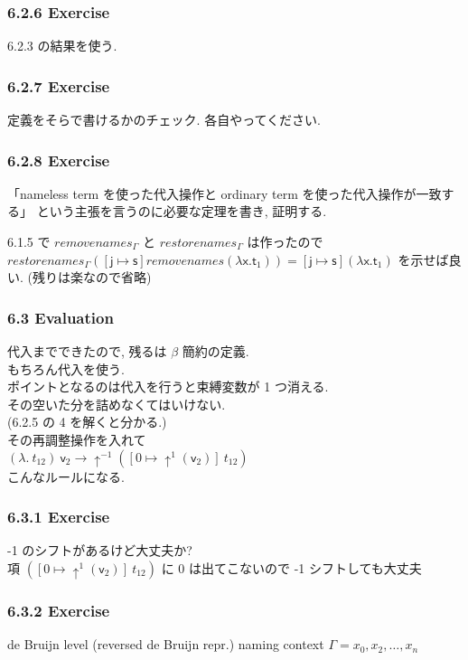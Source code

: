 \documentclass[13pt,dvipdfm]{beamer}
\begin{document}
\frame
{
  \frametitle{6.2.6 Exercise}
  6.2.3 の結果を使う.
}

\frame
{
  \frametitle{6.2.7 Exercise}
  定義をそらで書けるかのチェック.
  各自やってください.
}

\frame
{
  \frametitle{6.2.8 Exercise}
  「nameless term を使った代入操作と ordinary term を使った代入操作が一致する」
  という主張を言うのに必要な定理を書き, 証明する.

  6.1.5 で $removenames_{\Gamma}$ と $restorenames_{\Gamma}$ は作ったので \\
  $restorenames_{\Gamma}([\mathsf{j} \mapsto \mathsf{s}] removenames(\lambda \mathsf{x}. \mathsf{t}_1)) = [\mathsf{j} \mapsto \mathsf{s}] (\lambda \mathsf{x}. \mathsf{t}_1)$
  を示せば良い. (残りは楽なので省略)
}

\frame
{
  \frametitle{6.3 Evaluation}
  代入までできたので, 残るは $\beta$ 簡約の定義.\\
  もちろん代入を使う.\\
  ポイントとなるのは代入を行うと束縛変数が 1 つ消える.\\
  その空いた分を詰めなくてはいけない.\\
  (6.2.5 の 4 を解くと分かる.)\\
  その再調整操作を入れて\\
  $(\lambda.\ t_{12})\ \mathsf{v}_2 \longrightarrow \uparrow^{-1} ([0 \mapsto \uparrow^{1} (\mathsf{v}_2)]\ t_{12})$\\
  こんなルールになる.
}

\frame
{
  \frametitle{6.3.1 Exercise}
  -1 のシフトがあるけど大丈夫か?\\
  項 $([0 \mapsto \uparrow^{1} (\mathsf{v}_2)]\ t_{12})$ に 0 は出てこないので -1 シフトしても大丈夫
}

\frame
{
  \frametitle{6.3.2 Exercise}
  de Bruijn level (reversed de Bruijn repr.)
  naming context $\Gamma = x_0, x_2,\dots,x_n$
}
\end{document}
